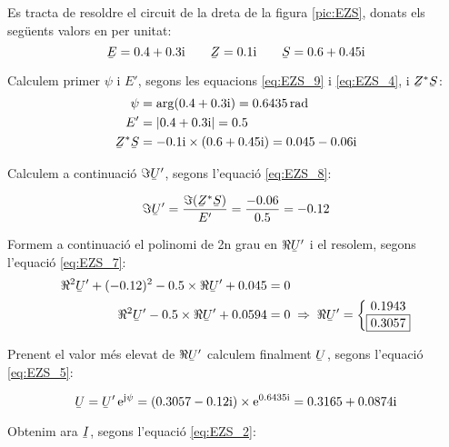 \begin{exemple}\label{ex:ResCircPotAbs}
	\addcontentsxms{\ResCircPotAbs}
    Es tracta de resoldre el circuit de la dreta de la figura \vref{pic:EZS}, donats els següents valors en per unitat:\label{ex:res-circ-pot}
    \[
       \cmplx{E} = \complexnum{0,4 + j 0,3} \qquad \cmplx{Z} = \complexnum{j 0,1} \qquad
       \cmplx{S} = \complexnum{0,6 + j 0,45}
    \]

    Calculem primer $\psi$ i $E'$, segons les equacions \eqref{eq:EZS_9} i \eqref{eq:EZS_4},
    i $\cmplx{Z}^* \cmplx{S}$:
    \begin{align*}
       \psi &= \arg(\complexnum{0,4 + j 0,3}) = \qty{0,6435}{rad} \\
       E' &= |\complexnum{0,4 + j 0,3}| = \num {0,5} \\
       \cmplx{Z}^* \cmplx{S} &= \complexnum{- j 0,1} \times (\complexnum{0,6 + j 0,45}) = \complexnum{0,045 - j 0,06}
    \end{align*}

    Calculem a continuació $\Im\cmplx{U}'$, segons l'equació \eqref{eq:EZS_8}:

    \[
       \Im\cmplx{U}' = \frac{\Im(\cmplx{Z}^* \cmplx{S})}{E'} = \frac{\num{-0,06}}{\num{0,5}} = \num{-0,12}
    \]

    Formem a continuació el polinomi de 2n grau en $\Re\cmplx{U}'$ i el resolem, segons l'equació \eqref{eq:EZS_7}:
    \begin{align*}
       \Re^2\cmplx{U}' + (\num{-0,12})^2 - \num{0,5} \times \Re\cmplx{U}' + \num{0,045} &= 0 \\
       \Re^2\cmplx{U}' - \num{0,5} \times \Re\cmplx{U}' + \num{0,0594} &= 0  \;\Rightarrow\; \Re\cmplx{U}' =
       \left\{ \begin{matrix}
         \num{0,1943} \\
         \boxed{\num{0,3057}}
       \end{matrix}
       \right.
    \end{align*}

    Prenent el valor més elevat de $\Re\cmplx{U}'$ calculem finalment $\cmplx{U}$, segons l'equació \eqref{eq:EZS_5}:

    \[
       \cmplx{U} = \cmplx{U}' \, \eu^{\ju \psi} = (\complexnum{0,3057 - j 0,12}) \times \eu^{\complexnum{j 0,6435}} =
       \complexnum{0,3165 + j 0,0874}
    \]

    Obtenim ara $\cmplx{I}$, segons l'equació \eqref{eq:EZS_2}:


\end{exemple}
